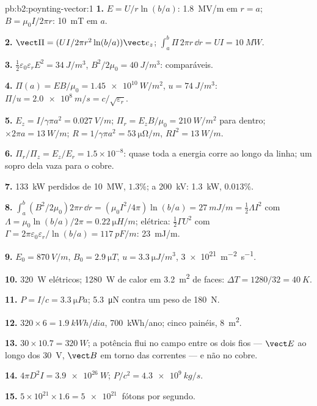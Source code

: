 \begin{solution}{pb:b2:poynting-vector:1}
\textbf{1.} $E = U/r\ln(b/a)$: \qty{1.8}{MV/m} em $r = a$; $B = \mu_0I/2\pi r$:
\qty{10}{mT} em $a$.

\textbf{2.} $\vect\Pi = (UI/2\pi r^2\ln(b/a))\vect e_z$; $\int_a^b\Pi\,2\pi r\,\dd r = UI =
\qty{10}{MW}$.

\textbf{3.} $\tfrac12\varepsilon_0\varepsilon_rE^2 = \qty{34}{J/m^3}$, $B^2/2\mu_0 = \qty{40}{J/m^3}$:
comparáveis.

\textbf{4.} $\Pi(a) = EB/\mu_0 = \qty{1.45e10}{W/m^2}$, $u = \qty{74}{J/m^3}$: $\Pi/u =
\qty{2.0e8}{m/s} = c/\sqrt{\varepsilon_r}$.

\textbf{5.} $E_z = I/\gamma\pi a^2 = \qty{0.027}{V/m}$; $\Pi_r = E_zB/\mu_0 = \qty{210}{W/m^2}$
para dentro; $\times2\pi a = \qty{13}{W/m}$; $R = 1/\gamma\pi a^2 = \qty{53}{\micro\ohm/m}$, $RI^2 =
\qty{13}{W/m}$.

\textbf{6.} $\Pi_r/\Pi_z = E_z/E_r = 1.5 \times 10^{-8}$: quase toda a energia corre
ao longo da linha; um sopro dela vaza para o cobre.

\textbf{7.} \qty{133}{kW} perdidos de \qty{10}{MW}, $1.3\%$; a \qty{200}{kV}: \qty{1.3}{kW},
$0.013\%$.

\textbf{8.} $\int_a^b(B^2/2\mu_0)2\pi r\,\dd r = (\mu_0I^2/4\pi)\ln(b/a) = \qty{27}{mJ/m} =
\tfrac12\Lambda I^2$ com $\Lambda = \mu_0\ln(b/a)/2\pi = \qty{0.22}{\micro H/m}$; elétrica:
$\tfrac12\Gamma U^2$ com $\Gamma = 2\pi\varepsilon_0\varepsilon_r/\ln(b/a) = \qty{117}{pF/m}$: \qty{23}{mJ/m}.

\textbf{9.} $E_0 = \qty{870}{V/m}$, $B_0 = \qty{2.9}{\micro T}$, $u = \qty{3.3}{\micro J/m^3}$,
\qty{3e21}{m^{-2}.s^{-1}}.

\textbf{10.} \qty{320}{W} elétricos; \qty{1280}{W} de calor em \qty{3.2}{m^2} de
faces: $\Delta T = 1280/32 = \qty{40}{K}$.

\textbf{11.} $P = I/c = \qty{3.3}{\micro Pa}$; \qty{5.3}{\micro N} contra um peso de
\qty{180}{N}.

\textbf{12.} $320 \times 6 = \qty{1.9}{kWh/dia}$, \qty{700}{kWh/ano}; cinco painéis,
\qty{8}{m^2}.

\textbf{13.} $30 \times 10.7 = \qty{320}{W}$; a potência flui no campo entre
os dois fios --- $\vect E$ ao longo dos \qty{30}{V}, $\vect B$ em torno das correntes ---
e não no cobre.

\textbf{14.} $4\pi D^2I = \qty{3.9e26}{W}$; $P/c^2 = \qty{4.3e9}{kg/s}$.

\textbf{15.} $5 \times 10^{21} \times 1.6 = \qty{5e21}{}$ fótons por segundo.


\end{solution}
